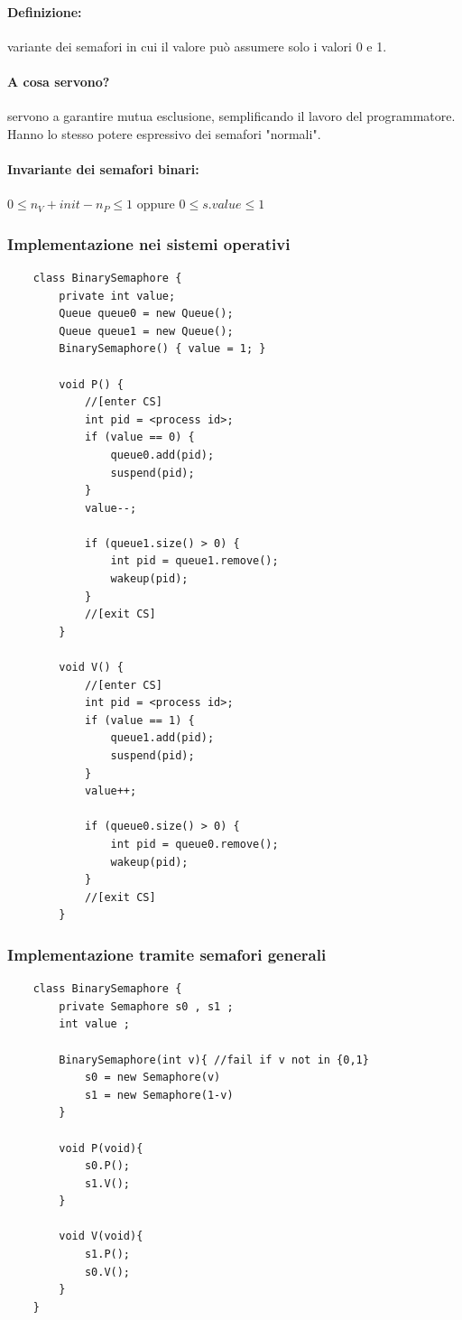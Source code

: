 \paragraph{Definizione:}variante dei semafori in cui il valore può assumere solo i valori 0 e 1.

\paragraph{A cosa servono?}servono a garantire mutua esclusione, semplificando il lavoro del programmatore.
Hanno lo stesso potere espressivo dei semafori "normali".

\paragraph{Invariante dei semafori binari:}
$0 \leq n_V + init - n_P \leq 1$ oppure $0 \leq s.value \leq 1$
\newpage

\subsubsection{Implementazione nei sistemi operativi}
\begin{lstlisting}
    class BinarySemaphore {
        private int value;
        Queue queue0 = new Queue();
        Queue queue1 = new Queue();
        BinarySemaphore() { value = 1; }

        void P() {
            //[enter CS]
            int pid = <process id>;
            if (value == 0) {
                queue0.add(pid);
                suspend(pid);
            }
            value--;
        
            if (queue1.size() > 0) {
                int pid = queue1.remove();
                wakeup(pid);
            }
            //[exit CS]
        }

        void V() {
            //[enter CS]
            int pid = <process id>;
            if (value == 1) {
                queue1.add(pid);
                suspend(pid);
            }
            value++;
            
            if (queue0.size() > 0) {
                int pid = queue0.remove();
                wakeup(pid);
            }
            //[exit CS]
        }
\end{lstlisting}

\subsubsection{Implementazione tramite semafori generali}
\begin{lstlisting}
    class BinarySemaphore {
        private Semaphore s0 , s1 ;
        int value ;

        BinarySemaphore(int v){ //fail if v not in {0,1}
            s0 = new Semaphore(v)
            s1 = new Semaphore(1-v)
        }
        
        void P(void){
            s0.P();
            s1.V();
        }

        void V(void){
            s1.P();
            s0.V();
        }
    }
\end{lstlisting}

